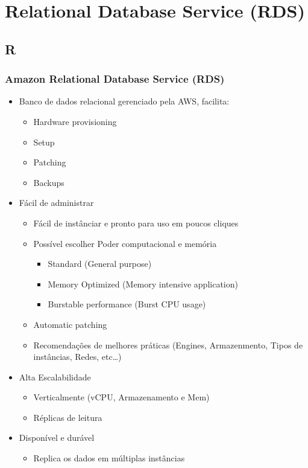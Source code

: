 \section{Relational Database Service (RDS)}

\subsection{R}

\begin{frame}[allowframebreaks]
	\frametitle{Amazon Relational Database Service (RDS)}
	\begin{itemize}
		\item Banco de dados relacional gerenciado pela AWS, facilita:
			\begin{itemize}
				\item Hardware provisioning
				\item Setup
				\item Patching
				\item Backups
			\end{itemize}
		\item Fácil de administrar
			\begin{itemize}
				\item Fácil de instânciar e pronto para uso em poucos cliques
				\item Possível escolher Poder computacional e memória
					\begin{itemize}
						\item Standard (General purpose)
						\item Memory Optimized (Memory intensive application)
						\item Burstable performance (Burst CPU usage)
					\end{itemize}
				\item Automatic patching
				\item Recomendações de melhores práticas (Engines, Armazenmento, Tipos de instâncias, Redes, etc\dots)
			\end{itemize}
		\item Alta Escalabilidade
			\begin{itemize}
				\item Verticalmente (vCPU, Armazenamento e Mem)
				\item Réplicas de leitura
			\end{itemize}
		\item Disponível e durável
			\begin{itemize}
				\item Replica os dados em múltiplas instâncias

\end{itemize}
\end{itemize}
\end{frame}
